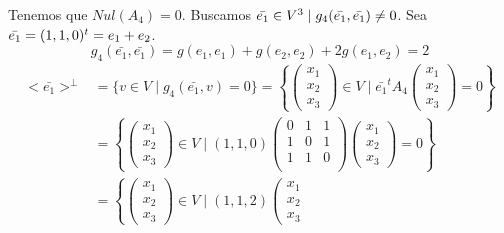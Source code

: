 \begin{ejercicio}
\begin{enumerate}
\begin{enumerate}
            Tenemos que $Nul(A_4)=0$. Buscamos $\Bar{e_1}\in V^3 \mid g_4(\Bar{e_1},\Bar{e_1})\neq 0$. Sea $\Bar{e_1}=(1,1,0)^t=e_1+e_2$.
            \begin{equation*}
                g_4(\bar{e_1}, \bar{e_1}) = g(e_1,e_1) + g(e_2,e_2) + 2g(e_1,e_2) = 2
            \end{equation*}
            \begin{equation*}\begin{split}
                <\bar{e_1}>^\perp &= \{v \in V \mid g_4(\bar{e_1},v) = 0\} 
                = \left\{ \left(\begin{array}{c}
                     x_1 \\ x_2 \\ x_3
                \end{array} \right) \in V \mid \bar{e_1}^t A_4
                \left(\begin{array}{c}
                     x_1 \\ x_2 \\ x_3
                \end{array} \right) = 0\right\} \\
                &= \left\{ \left(\begin{array}{c}
                     x_1 \\ x_2 \\ x_3
                \end{array} \right) \in V \mid (1,1,0)\left(\begin{array}{ccc}
                    0 & 1 & 1 \\
                    1 & 0 & 1 \\
                    1 & 1 & 0 \\
                \end{array} \right) 
                \left(\begin{array}{c}
                     x_1 \\ x_2 \\ x_3
                \end{array} \right) = 0\right\} \\
                &= \left\{ \left(\begin{array}{c}
                     x_1 \\ x_2 \\ x_3
                \end{array} \right) \in V \mid (1,1,2)
                \left(\begin{array}{c}
                     x_1 \\ x_2 \\ x_3

\end{array}
\end{split}
\end{equation*}
\end{enumerate}
\end{enumerate}
\end{ejercicio}
